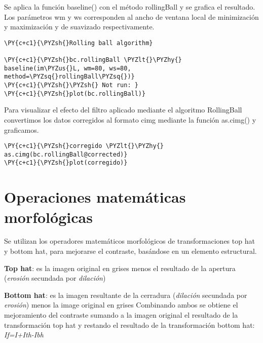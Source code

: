     Se aplica la función baseline() con el método rollingBall y se grafica
el resultado. Los parámetros wm y ws corresponden al ancho de ventana
local de minimización y maximización y de suavizado respectivamente.

    \begin{tcolorbox}[breakable, size=fbox, boxrule=1pt, pad at break*=1mm,colback=cellbackground, colframe=cellborder]
\begin{Verbatim}[commandchars=\\\{\}]
\PY{c+c1}{\PYZsh{}Rolling ball algorithm}

\PY{c+c1}{\PYZsh{}bc.rollingBall \PYZlt{}\PYZhy{} baseline(im\PYZus{}L, wm=80, ws=80, method=\PYZsq{}rollingBall\PYZsq{})}
\PY{c+c1}{\PYZsh{}\PYZsh{} Not run: }
\PY{c+c1}{\PYZsh{}plot(bc.rollingBall)}
\end{Verbatim}
\end{tcolorbox}

    Para visualizar el efecto del filtro aplicado mediante el algoritmo
RollingBall convertimos los datos corregidos al formato cimg mediante la
función as.cimg() y graficamos.

    \begin{tcolorbox}[breakable, size=fbox, boxrule=1pt, pad at break*=1mm,colback=cellbackground, colframe=cellborder]
\begin{Verbatim}[commandchars=\\\{\}]
\PY{c+c1}{\PYZsh{}corregido \PYZlt{}\PYZhy{} as.cimg(bc.rollingBall@corrected)}
\PY{c+c1}{\PYZsh{}plot(corregido)}
\end{Verbatim}
\end{tcolorbox}

    \hypertarget{operaciones-matemuxe1ticas-morfoluxf3gicas}{%
\section{Operaciones matemáticas
morfológicas}\label{operaciones-matemuxe1ticas-morfoluxf3gicas}}

    Se utilizan los operadores matemáticos morfológicos de transformaciones
top hat y bottom hat, para mejorarse el contraste, basándose en un
elemento estructural.

    \textbf{Top hat}: es la imagen original en grises menos el resultado de
la apertura (\emph{erosión} secundada por \emph{dilación})

\textbf{Bottom hat}: es la imagen resultante de la cerradura
(\emph{dilación} secundada por \emph{erosión}) menos la image original
en grises Combinando ambos se obtiene el mejoramiento del contraste
sumando a la imagen original el resultado de la transformación top hat y
restando el resultado de la transformación bottom hat:
\emph{If=I+Ith-Ibh}

